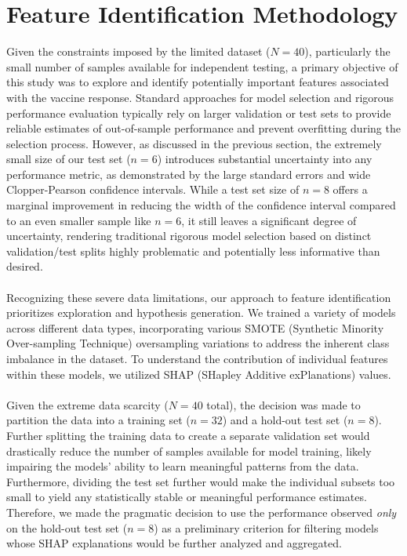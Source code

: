 \documentclass[12pt,a4paper]{report}
\begin{document}
\section{Feature Identification Methodology}
Given the constraints imposed by the limited dataset ($N=40$), particularly the small number of samples available for independent testing, a primary objective of this study was to explore and identify potentially important features associated with the vaccine response. Standard approaches for model selection and rigorous performance evaluation typically rely on larger validation or test sets to provide reliable estimates of out-of-sample performance and prevent overfitting during the selection process. However, as discussed in the previous section, the extremely small size of our test set ($n=6$) introduces substantial uncertainty into any performance metric, as demonstrated by the large standard errors and wide Clopper-Pearson confidence intervals. While a test set size of $n=8$ offers a marginal improvement in reducing the width of the confidence interval compared to an even smaller sample like $n=6$, it still leaves a significant degree of uncertainty, rendering traditional rigorous model selection based on distinct validation/test splits highly problematic and potentially less informative than desired.\\
\\
Recognizing these severe data limitations, our approach to feature identification prioritizes exploration and hypothesis generation. We trained a variety of models across different data types, incorporating various SMOTE (Synthetic Minority Over-sampling Technique) oversampling variations to address the inherent class imbalance in the dataset. To understand the contribution of individual features within these models, we utilized SHAP (SHapley Additive exPlanations) values.\\
\\
Given the extreme data scarcity ($N=40$ total), the decision was made to partition the data into a training set ($n=32$) and a hold-out test set ($n=8$). Further splitting the training data to create a separate validation set would drastically reduce the number of samples available for model training, likely impairing the models' ability to learn meaningful patterns from the data. Furthermore, dividing the test set further would make the individual subsets too small to yield any statistically stable or meaningful performance estimates. Therefore, we made the pragmatic decision to use the performance observed \textit{only} on the hold-out test set ($n=8$) as a preliminary criterion for filtering models whose SHAP explanations would be further analyzed and aggregated.\\
\end{document}
